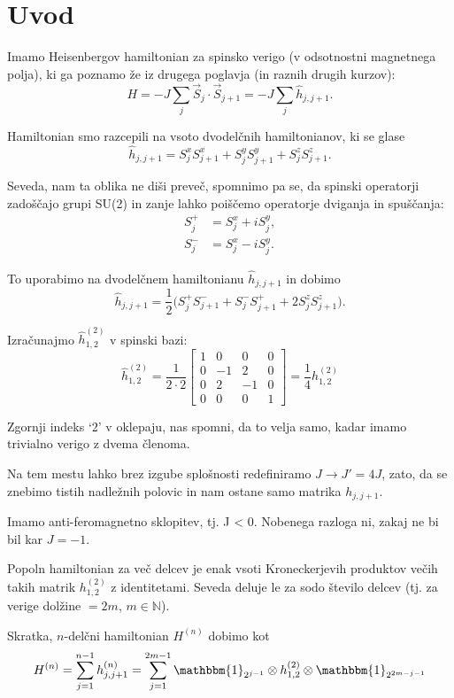 \documentclass[12pt, a4paper]{article}
\begin{document}
\section{Uvod}
Imamo Heisenbergov hamiltonian za spinsko verigo (v odsotnostni magnetnega polja), ki ga poznamo že iz
drugega poglavja (in raznih drugih kurzov):
\[
	H = -J\sum_j \vec{S}_j \cdot \vec{S}_{j+1} = -J \sum_j \hat{h}_{j,j+1}.
\]

Hamiltonian smo razcepili na vsoto dvodelčnih hamiltonianov, ki se glase
\[
	\hat{h}_{j,j+1} = S_j^x S_{j+1}^x + S_j^y S_{j+1}^y + S_j^z S_{j+1}^z.
\]

Seveda, nam ta oblika ne diši preveč, spomnimo pa se, da spinski operatorji zadoščajo
grupi SU(2) in zanje lahko poiščemo operatorje dviganja in spuščanja:
\begin{align*}
	S_j^+ &= S_j^x + iS_j^y,\\
	S_j^- &= S_j^x - iS_j^y.
\end{align*}

To uporabimo na dvodelčnem hamiltonianu $\hat{h}_{j,j+1}$ in dobimo
\[
	\hat{h}_{j,j+1} = \frac{1}{2}\big(S^+_jS^-_{j+1} + S^-_jS^+_{j+1} + 2S^z_jS^z_{j+1}\big).
\]

Izračunajmo $\hat{h}^{(2)}_{1,2}$ v spinski bazi:
\[
	\hat{h}^{(2)}_{1,2} = \frac{1}{2 \cdot 2}\begin{bmatrix}
		1 & 0 & 0 & 0 \\
		0 &-1 & 2 & 0 \\
		0 & 2 & -1& 0 \\
		0 & 0 & 0 & 1
	\end{bmatrix} = \frac{1}{4} h^{(2)}_{1,2}
\]

Zgornji indeks `2' v oklepaju, nas spomni, da to velja samo, kadar imamo trivialno verigo z dvema
\v clenoma.

Na tem mestu lahko brez izgube splošnosti redefiniramo $J \to J' = 4J$, zato, da se znebimo tistih
nadle\v znih polovic in nam ostane samo matrika $h_{j,j+1}$. 

Imamo anti-feromagnetno sklopitev, tj. J < 0. Nobenega razloga ni, zakaj ne bi bil kar $J = -1$.

Popoln hamiltonian za več delcev je enak vsoti Kroneckerjevih produktov večih takih matrik
$h^{(2)}_{1,2}$ z identitetami. Seveda deluje le za sodo število delcev (tj. za verige dolžine $
= 2m$, $m \in \mathbb{N}$).

Skratka, $n$-delčni hamiltonian $H^{(n)}$ dobimo kot
\begin{equation}
	H^{(n)} = \sum_{j = 1}^{n - 1} h^{(n)}_{j,j+1} = \sum_{j = 1}^{2m - 1} \mathbbm{1}_{2^{j-1}}
	\otimes h^{(2)}_{1,2} \otimes \mathbbm{1}_{2^{2m - j - 1}}
	\label{hamilton}
\end{equation}
\end{document}
